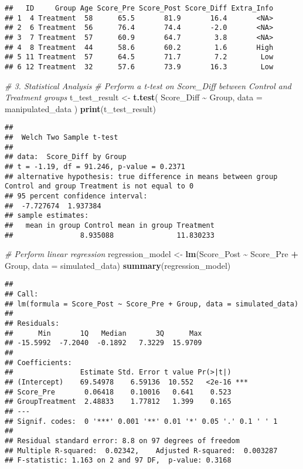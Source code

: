 \documentclass[
]{article}
\newenvironment{Shaded}{\begin{snugshade}}{\end{snugshade}}
\newcommand{\AttributeTok}[1]{\textcolor[rgb]{0.13,0.29,0.53}{#1}}
\newcommand{\CommentTok}[1]{\textcolor[rgb]{0.56,0.35,0.01}{\textit{#1}}}
\newcommand{\FunctionTok}[1]{\textcolor[rgb]{0.13,0.29,0.53}{\textbf{#1}}}
\newcommand{\NormalTok}[1]{#1}
\newcommand{\OtherTok}[1]{\textcolor[rgb]{0.56,0.35,0.01}{#1}}
\newcommand{\SpecialCharTok}[1]{\textcolor[rgb]{0.81,0.36,0.00}{\textbf{#1}}}
\begin{document}
\begin{verbatim}
##   ID     Group Age Score_Pre Score_Post Score_Diff Extra_Info
## 1  4 Treatment  58      65.5       81.9       16.4       <NA>
## 2  6 Treatment  56      76.4       74.4       -2.0       <NA>
## 3  7 Treatment  57      60.9       64.7        3.8       <NA>
## 4  8 Treatment  44      58.6       60.2        1.6       High
## 5 11 Treatment  57      64.5       71.7        7.2        Low
## 6 12 Treatment  32      57.6       73.9       16.3        Low
\end{verbatim}

\begin{Shaded}
\begin{Highlighting}[]
\CommentTok{\# 3. Statistical Analysis}
\CommentTok{\# Perform a t{-}test on Score\_Diff between Control and Treatment groups}
\NormalTok{t\_test\_result }\OtherTok{\textless{}{-}} \FunctionTok{t.test}\NormalTok{(}
\NormalTok{  Score\_Diff }\SpecialCharTok{\textasciitilde{}}\NormalTok{ Group,}
  \AttributeTok{data =}\NormalTok{ manipulated\_data}
\NormalTok{)}
\FunctionTok{print}\NormalTok{(t\_test\_result)}
\end{Highlighting}
\end{Shaded}

\begin{verbatim}
## 
##  Welch Two Sample t-test
## 
## data:  Score_Diff by Group
## t = -1.19, df = 91.246, p-value = 0.2371
## alternative hypothesis: true difference in means between group Control and group Treatment is not equal to 0
## 95 percent confidence interval:
##  -7.727674  1.937384
## sample estimates:
##   mean in group Control mean in group Treatment 
##                8.935088               11.830233
\end{verbatim}

\begin{Shaded}
\begin{Highlighting}[]
\CommentTok{\# Perform linear regression}
\NormalTok{regression\_model }\OtherTok{\textless{}{-}} \FunctionTok{lm}\NormalTok{(Score\_Post }\SpecialCharTok{\textasciitilde{}}\NormalTok{ Score\_Pre }\SpecialCharTok{+}\NormalTok{ Group, }\AttributeTok{data =}\NormalTok{ simulated\_data)}
\FunctionTok{summary}\NormalTok{(regression\_model)}
\end{Highlighting}
\end{Shaded}

\begin{verbatim}
## 
## Call:
## lm(formula = Score_Post ~ Score_Pre + Group, data = simulated_data)
## 
## Residuals:
##      Min       1Q   Median       3Q      Max 
## -15.5992  -7.2040  -0.1892   7.3229  15.9709 
## 
## Coefficients:
##                Estimate Std. Error t value Pr(>|t|)    
## (Intercept)    69.54978    6.59136  10.552   <2e-16 ***
## Score_Pre       0.06418    0.10016   0.641    0.523    
## GroupTreatment  2.48833    1.77812   1.399    0.165    
## ---
## Signif. codes:  0 '***' 0.001 '**' 0.01 '*' 0.05 '.' 0.1 ' ' 1
## 
## Residual standard error: 8.8 on 97 degrees of freedom
## Multiple R-squared:  0.02342,    Adjusted R-squared:  0.003287 
## F-statistic: 1.163 on 2 and 97 DF,  p-value: 0.3168
\end{verbatim}
\end{document}
